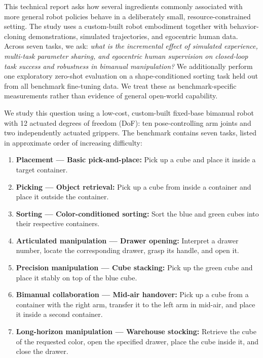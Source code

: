 \documentclass[10pt,conference]{IEEEtran}
\begin{document}
This technical report asks how several ingredients commonly associated with
more general robot policies behave in a deliberately small, resource-constrained
setting. The study uses a custom-built robot embodiment together with
behavior-cloning demonstrations, simulated trajectories, and egocentric human
data. Across seven tasks, we ask: \emph{what is the incremental effect of
simulated experience, multi-task parameter sharing, and egocentric human
supervision on closed-loop task success and robustness in bimanual
manipulation?} We additionally perform one exploratory zero-shot evaluation on
a shape-conditioned sorting task held out from all benchmark fine-tuning data.
We treat these as benchmark-specific measurements rather than evidence of
general open-world capability.

We study this question using a low-cost, custom-built fixed-base bimanual
robot with 12 actuated degrees of freedom (DoF): ten pose-controlling arm
joints and two independently actuated grippers. The benchmark contains seven tasks,
listed in approximate order of increasing difficulty:

\begin{enumerate}[leftmargin=*,label=\textbf{\arabic*.}]

    \item \textbf{Placement --- Basic pick-and-place:}
    Pick up a cube and place it inside a target container.

    \item \textbf{Picking --- Object retrieval:}
    Pick up a cube from inside a container and place it outside the container.

    \item \textbf{Sorting --- Color-conditioned sorting:}
    Sort the blue and green cubes into their respective containers.

    \item \textbf{Articulated manipulation --- Drawer opening:}
    Interpret a drawer number, locate the corresponding drawer, grasp its
    handle, and open it.

    \item \textbf{Precision manipulation --- Cube stacking:}
    Pick up the green cube and place it stably on top of the blue cube.

    \item \textbf{Bimanual collaboration --- Mid-air handover:}
    Pick up a cube from a container with the right arm, transfer it to the left arm
    in mid-air, and place it inside a second container.

    \item \textbf{Long-horizon manipulation --- Warehouse stocking:}
    Retrieve the cube of the requested color, open the
    specified drawer, place the cube inside it, and close the drawer.

\end{enumerate}
\end{document}
